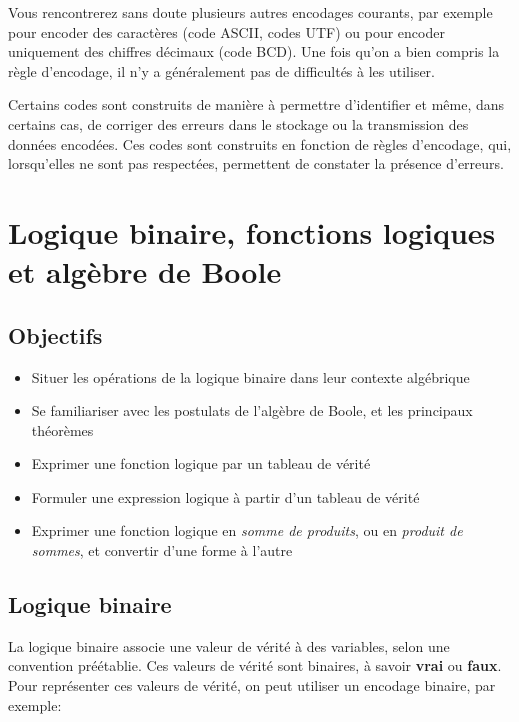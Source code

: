 \documentclass[letter, oneside]{book}
\begin{document}
\begin{enumerate}
Vous rencontrerez sans doute plusieurs autres encodages courants,
par exemple pour encoder des caractères (code ASCII, codes UTF)
ou pour encoder uniquement des chiffres décimaux (code BCD). Une fois
qu'on a bien compris la règle d'encodage, il n'y a généralement pas de
difficultés à les utiliser.

Certains codes sont construits de manière à permettre d'identifier et
même, dans certains cas, de corriger des erreurs dans le stockage ou
la transmission des données encodées. Ces codes sont construits en
fonction de règles d'encodage, qui, lorsqu'elles ne sont pas
respectées, permettent de constater la présence d'erreurs.
\end{enumerate}

\chapter{Logique binaire, fonctions logiques et algèbre de Boole}
\label{sec:org27e5356}


\section{Objectifs}
\label{sec:orgb4cbfbb}
\begin{itemize}
\item Situer les opérations de la logique binaire dans leur contexte algébrique
\item Se familiariser avec les postulats de l'algèbre de Boole, et les
principaux théorèmes
\item Exprimer une fonction logique par un tableau de vérité
\item Formuler une expression logique à partir d'un tableau de vérité
\item Exprimer une fonction logique en \emph{somme de produits}, ou en
\emph{produit de sommes}, et convertir d'une forme à l'autre
\end{itemize}

\section{Logique binaire}
\label{sec:org1426326}

La logique binaire associe une valeur de vérité à des variables, selon
une convention préétablie. Ces valeurs de vérité sont binaires, à
savoir \textbf{vrai} ou \textbf{faux}. Pour représenter ces valeurs de vérité, on
peut utiliser un encodage binaire, par exemple:
\end{document}
